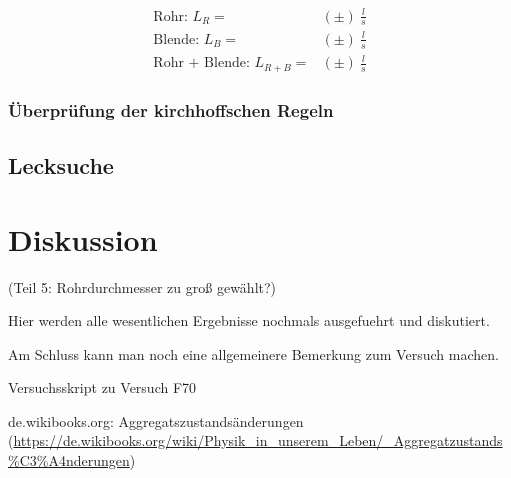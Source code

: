 \documentclass[12pt, a4paper]{scrartcl}
\begin{document}
        \begin{align*}
            \text{Rohr: }L_R=&(\pm)\ \frac l s\\
            \text{Blende: } L_B=&(\pm)\ \frac l s\\
            \text{Rohr + Blende: } L_{R+B}=&(\pm)\ \frac l s
        \end{align*}
        
        \subsubsection*{Überprüfung der kirchhoffschen Regeln}
    
    \subsection{Lecksuche}
	
	\section{Diskussion}
    
    (Teil 5: Rohrdurchmesser zu groß gewählt?)
	
	Hier werden alle wesentlichen Ergebnisse nochmals ausgefuehrt und diskutiert. 
	
	Am Schluss kann man noch eine allgemeinere Bemerkung zum Versuch machen.
	
	
	\newpage 
	
	\begin{thebibliography}{00}   %
		
		 Versuchsskript zu Versuch F70
		
		 de.wikibooks.org: Aggregatszustandsänderungen\\ (\url{https://de.wikibooks.org/wiki/Physik_in_unserem_Leben/_Aggregatzustands%C3%A4nderungen})
		
	\end{thebibliography}
	
\end{document}
